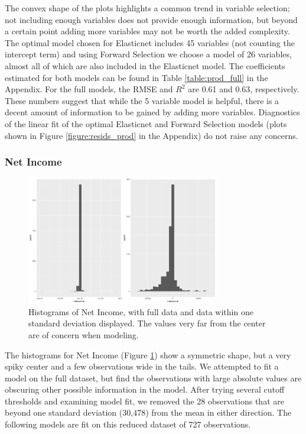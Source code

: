 \documentclass{article}
\begin{document}
The convex shape of the plots highlights a common trend in variable selection; not including enough variables does not provide 
enough information, but beyond a certain point adding more variables may not be worth the added complexity. The optimal 
model chosen for Elasticnet includes 45 variables (not counting the intercept term) and using Forward Selection we choose a 
model of 26 variables, almost all of which are also included in the Elasticnet model. The coefficients estimated for both models 
can be found in Table \ref{table:prod_full} in the Appendix. For the full models, the RMSE and $R^2$ are 0.61 and 0.63, 
respectively. These numbers suggest that while the 5 variable model is helpful, there is a decent amount of information to be 
gained by adding more variables. Diagnostics of the linear fit of the optimal Elasticnet and Forward Selection models (plots shown in Figure \ref{figure:resids_prod} in the Appendix) do not raise any concerns. 



\subsubsection{Net Income}

\begin{figure}[h]
\centering
\includegraphics[width = 0.75\textwidth]{netincome_histograms.pdf}
\caption{Histograms of Net Income, with full data and data within one standard deviation displayed. The values very far from the center are of concern when modeling.}
\label{figure:netincome_hist}
\end{figure}

The histograms for Net Income (Figure \ref{figure:netincome_hist}) show a symmetric shape, but a very spiky center and a few 
observations wide in the tails. We attempted to fit a model on the full dataset, but find the observations with large absolute 
values are obscuring other possible information in the model. After trying several cutoff thresholds and examining model fit, we  removed the 28 observations that are beyond one standard deviation (30,478) from the mean in either direction. The 
following models are fit on this reduced dataset of 727 observations.
\end{document}
